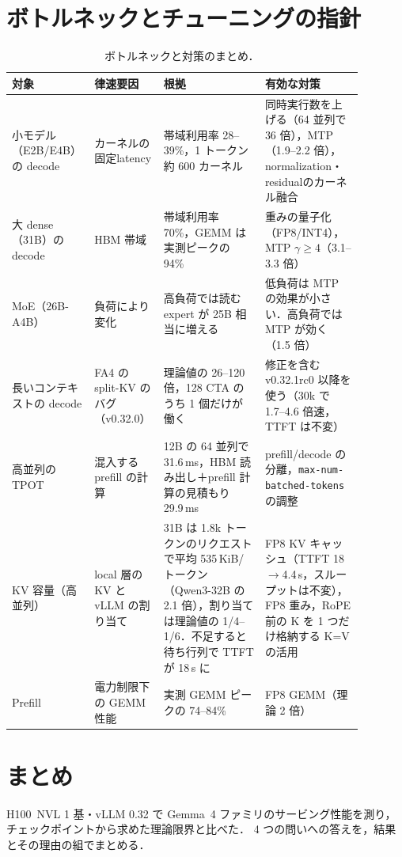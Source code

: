 \clearpage
\section{ボトルネックとチューニングの指針}
\label{sec:tuning}
\begin{table}[H]\centering\small
\caption{ボトルネックと対策のまとめ．}
\label{tab:tuning}
\begin{tabular}{L{0.16\linewidth}L{0.16\linewidth}L{0.29\linewidth}L{0.27\linewidth}}\toprule
対象 & 律速要因 & 根拠 & 有効な対策 \\\midrule
小モデル（E2B/E4B）の decode & カーネルの固定latency & 帯域利用率 28--39\%，1 トークン約 600 カーネル & 同時実行数を上げる（64 並列で 36 倍），MTP（1.9--2.2 倍），normalization・residualのカーネル融合 \\
大 dense（31B）の decode & HBM 帯域 & 帯域利用率 70\%，GEMM は実測ピークの 94\% & 重みの量子化（FP8/INT4），MTP $\gamma \ge 4$（3.1--3.3 倍） \\
MoE（26B-A4B） & 負荷により変化 & 高負荷では読む expert が 25B 相当に増える & 低負荷は MTP の効果が小さい．高負荷では MTP が効く（1.5 倍） \\
長いコンテキストの decode & FA4 の split-KV のバグ（v0.32.0） & 理論値の 26--120 倍，128 CTA のうち 1 個だけが働く & 修正を含む v0.32.1rc0 以降を使う（30k で 1.7--4.6 倍速，TTFT は不変） \\
高並列の TPOT & 混入する prefill の計算 & 12B の 64 並列で 31.6\,ms，HBM 読み出し＋prefill 計算の見積もり 29.9\,ms & prefill/decode の分離，\texttt{max-num-batched-tokens} の調整 \\
KV 容量（高並列） & local 層の KV と vLLM の割り当て & 31B は 1.8k トークンのリクエストで平均 535\,KiB/トークン（Qwen3-32B の 2.1 倍），割り当ては理論値の 1/4--1/6．不足すると待ち行列で TTFT が 18\,s に & FP8 KV キャッシュ（TTFT 18$\to$4.4\,s，スループットは不変），FP8 重み，RoPE 前の K を 1 つだけ格納する K=V の活用 \\
Prefill & 電力制限下の GEMM 性能 & 実測 GEMM ピークの 74--84\% & FP8 GEMM（理論 2 倍） \\
\bottomrule\end{tabular}
\end{table}

\section{まとめ}
H100~NVL 1 基・vLLM 0.32 で Gemma~4 ファミリのサービング性能を測り，チェックポイントから求めた理論限界と比べた．
4 つの問いへの答えを，結果とその理由の組でまとめる．

